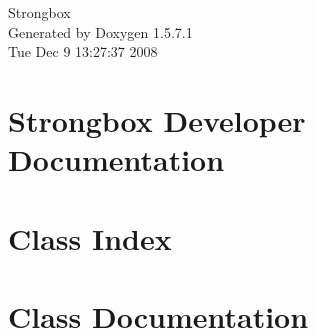 \documentclass[a4paper]{book}
\begin{document}
\begin{titlepage}
\vspace*{7cm}
\begin{center}
{\Large Strongbox }\\
\vspace*{1cm}
{\large Generated by Doxygen 1.5.7.1}\\
\vspace*{0.5cm}
{\small Tue Dec 9 13:27:37 2008}\\
\end{center}
\end{titlepage}
\clearemptydoublepage
{}
\tableofcontents
\clearemptydoublepage
{}
\chapter{Strongbox Developer Documentation}
\label{index}\hypertarget{index}{}
\chapter{Class Index}

\chapter{Class Documentation}

















\printindex
\end{document}
